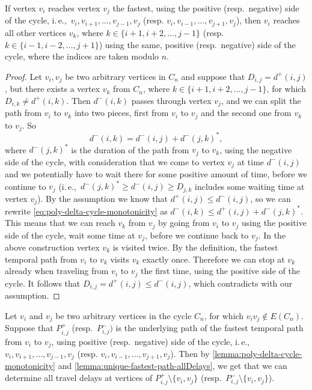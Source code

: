 \documentclass[a4paper,UKenglish,cleveref, autoref, thm-restate]{lipics-v2021}
\newcommand{\ie}{i.\,e.,\ }
\begin{document}
\begin{lemma} \label{lemma:poly-delta-cycle-monotonicity}
    If vertex $v_i$ reaches vertex $v_j$ the fastest, using the positive (resp.~negative) side of the cycle, \ie $v_i, v_{i+1}, \dots, v_{j-1}, v_j$ (resp. $v_i, v_{i-1}, \dots, v_{j+1}, v_j$),
    then $v_i$ reaches all other vertices $v_k$, where $k \in \{i+1, i+2, \dots, j-1\}$ (resp.~ $k \in \{i-1, i-2, \dots, j+1\}$)
    using the same, positive (resp.~negative) side of the cycle,
    where the indices are taken modulo $n$.
\end{lemma}
\begin{proof}
    Let $v_i, v_j$ be two arbitrary vertices in $C_n$ and suppose that $D_{i,j} = d^+(i,j)$,
    but there exists a vertex $v_k$ from $C_n$, where $k \in \{i+1, i+2, \dots, j-1\}$,
    for which $D_{i,k} \neq d^+(i,k)$.
    Then $d^-(i,k)$ passes through vertex $v_j$, and we can split the path from $v_i$ to $v_k$ into two pieces, 
    first from $v_i$ to $v_j$ and the second one from $v_k$ to $v_j$.
    So 
    \begin{equation} \label{eq:poly-delta-cycle-monotonicity}
        d^-(i,k) = d^-(i,j) + d^-(j,k)^*,
    \end{equation} where $d^-(j,k)^*$ is the duration of the path from $v_j$ to $v_k$, using the negative side of the cycle, with consideration that we come to vertex $v_j$ at time $d^-(i,j)$ and we potentially have to wait there for some positive amount of time, before we continue to $v_j$
    (\ie $d^-(j,k)^* \geq d^-(i,j) \geq D_{j,k}$ includes some waiting time at vertex $v_j$).
    By the assumption we know that $d^+(i,j) \leq d^-(i,j)$, so we can rewrite \cref{eq:poly-delta-cycle-monotonicity} as
    $d^-(i,k) \leq d^+(i,j) + d^-(j,k)^*$. This means that we can reach $v_k$ from $v_j$ by going from $v_i$ to $v_j$ using the positive side of the cycle, wait some time at $v_j$, before we continue back to $v_j$.
    In the above construction vertex $v_k$ is visited twice. By the definition, the fastest temporal path from $v_i$ to $v_k$ visits $v_k$ exactly once. Therefore we can stop at $v_k$ already when traveling from $v_i$ to $v_j$ the first time, using the positive side of the cycle.
    It follows that $D_{i,j} = d^+(i,j) \leq d^-(i,j)$, which contradicts with our assumption.
\end{proof}

Let $v_i$ and $v_j$ be two arbitrary vertices in the cycle $C_n$, for which $v_i v_j \notin E(C_n)$.
Suppose that $P^+_{i,j}$ (resp.~$P^-_{i,j})$ is the underlying path of the fastest temporal path from $v_i$ to $v_j$, 
using positive (resp.~negative) side of the cycle, 
\ie $v_i, v_{i+1}, \dots, v_{j-1}, v_j$ (resp. $v_i, v_{i-1}, \dots, v_{j+1}, v_j$).
Then by \cref{lemma:poly-delta-cycle-monotonicity} and \cref{lemma:unique-fastest-path-allDelays},
we get that we can determine all travel delays at vertices of $P^+_{i,j} \setminus \{v_i, v_j\}$ (resp.~$P^-_{i,j} \setminus \{v_i, v_j\}$).
\end{document}
